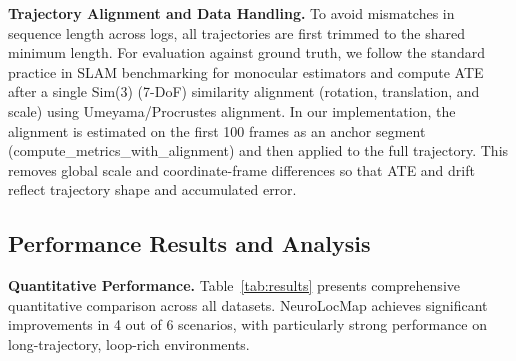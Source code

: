 \textbf{Trajectory Alignment and Data Handling.} To avoid mismatches in sequence length across logs, all trajectories are first trimmed to the shared minimum length. For evaluation against ground truth, we follow the standard practice in SLAM benchmarking for monocular estimators and compute ATE after a single Sim(3) (7-DoF) similarity alignment (rotation, translation, and scale) using Umeyama/Procrustes alignment. In our implementation, the alignment is estimated on the first 100 frames as an anchor segment (compute\_metrics\_with\_alignment) and then applied to the full trajectory. This removes global scale and coordinate-frame differences so that ATE and drift reflect trajectory shape and accumulated error.

\subsection{Performance Results and Analysis}

\textbf{Quantitative Performance.} Table~\ref{tab:results} presents comprehensive quantitative comparison across all datasets. NeuroLocMap achieves significant improvements in 4 out of 6 scenarios, with particularly strong per\-for\-mance on long-trajectory, loop-rich environments.

